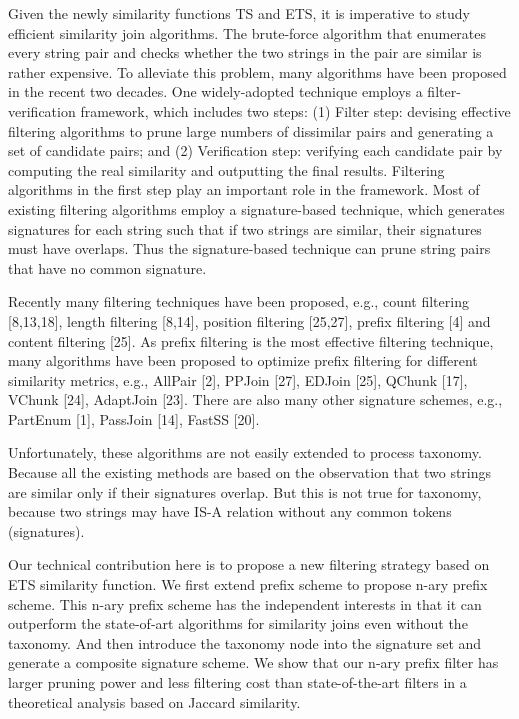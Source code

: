 Given the newly similarity functions TS and ETS, it is imperative to study efficient similarity join algorithms. The brute-force algorithm that enumerates every string pair and checks whether the two strings in the pair are similar is rather expensive. To alleviate this problem, many algorithms have been proposed in the recent two decades. One widely-adopted technique employs a filter-verification framework, which includes two steps: (1) Filter step: devising effective filtering algorithms to prune large numbers of dissimilar pairs and generating a set of candidate pairs; and (2) Verification step: verifying each candidate pair by computing
the real similarity and outputting the final results. Filtering algorithms in the first step play an important role
in the framework. Most of existing filtering algorithms employ a signature-based technique, which generates signatures for each string such that if two strings are similar, their signatures must have overlaps. Thus the signature-based technique can prune string pairs that have no common signature.

Recently many filtering techniques have been proposed, e.g., count filtering [8,13,18], length filtering [8,14], position
filtering [25,27], prefix filtering [4] and content filtering [25]. As prefix filtering is the most effective filtering technique,
many algorithms have been proposed to optimize prefix filtering for different similarity metrics, e.g., AllPair [2],
PPJoin [27], EDJoin [25], QChunk [17], VChunk [24], AdaptJoin [23]. There are also many other signature schemes, e.g., PartEnum [1],
PassJoin [14], FastSS [20].

Unfortunately, these algorithms are not easily extended to process taxonomy. Because all the existing methods are based on the observation that two strings are similar only if their signatures overlap. But this is not true for taxonomy, because two strings may have IS-A relation without any common tokens (signatures).

Our technical contribution here is to propose a new filtering strategy based on ETS similarity function. We first extend prefix scheme to propose n-ary prefix scheme. This n-ary prefix scheme has the independent interests in that it can outperform the state-of-art algorithms  for similarity joins even without the taxonomy. And then introduce the taxonomy node into the signature set and generate a composite signature scheme. We show that our n-ary prefix
filter has larger pruning power and less filtering cost
than state-of-the-art filters in a theoretical analysis based on Jaccard similarity.

